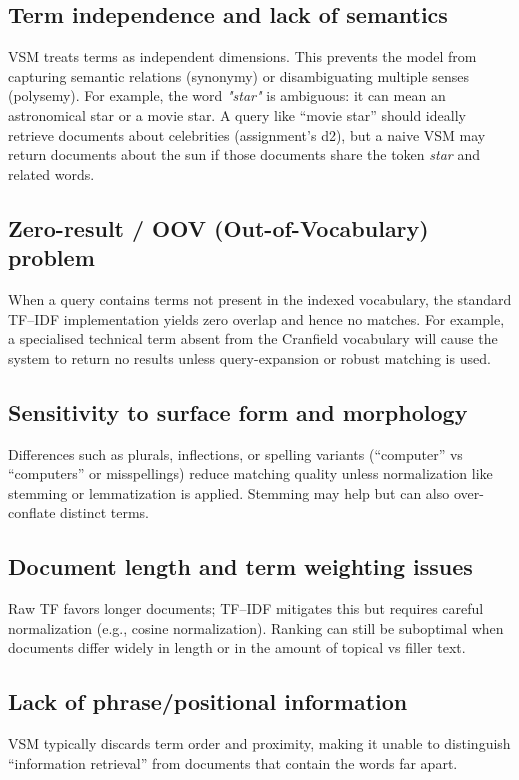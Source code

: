 \documentclass[11pt,a4paper]{article}
\begin{document}
\subsection{Term independence and lack of semantics}
VSM treats terms as independent dimensions. This prevents the model from capturing
semantic relations (synonymy) or disambiguating multiple senses (polysemy). For
example, the word \emph{"star"} is ambiguous: it can mean an astronomical star or
a movie star. A query like ``movie star'' should ideally retrieve documents about
celebrities (assignment's d2), but a naive VSM may return documents about the sun
if those documents share the token \textit{star} and related words.

\subsection{Zero-result / OOV (Out-of-Vocabulary) problem}
When a query contains terms not present in the indexed vocabulary, the standard
TF--IDF implementation yields zero overlap and hence no matches. For example, a
specialised technical term absent from the Cranfield vocabulary will cause the
system to return no results unless query-expansion or robust matching is used.

\subsection{Sensitivity to surface form and morphology}
Differences such as plurals, inflections, or spelling variants (``computer'' vs
``computers'' or misspellings) reduce matching quality unless normalization like
stemming or lemmatization is applied. Stemming may help but can also over-conflate
distinct terms.

\subsection{Document length and term weighting issues}
Raw TF favors longer documents; TF--IDF mitigates this but requires careful
normalization (e.g., cosine normalization). Ranking can still be suboptimal when
documents differ widely in length or in the amount of topical vs filler text.

\subsection{Lack of phrase/positional information}
VSM typically discards term order and proximity, making it unable to distinguish
``information retrieval'' from documents that contain the words far apart.
\end{document}
